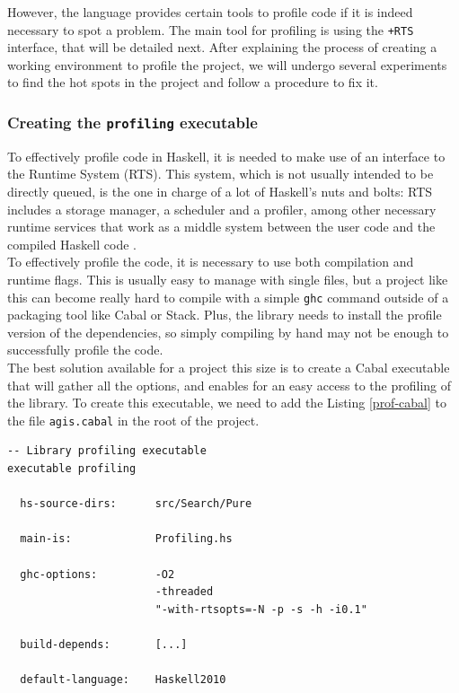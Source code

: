 However, the language provides certain tools to profile code if it is indeed
necessary to spot a problem. The main tool for profiling is using the
\texttt{+RTS} interface, that will be detailed next. After explaining the
process of creating a working environment to profile the project, we will
undergo several experiments to find the hot spots in the project and follow a
procedure to fix it.\\

\subsubsection{Creating the \texttt{profiling} executable}

To effectively profile code in Haskell, it is needed to make use of an
interface to the Runtime System (RTS). This system, which is not usually
intended to be directly queued, is the one in charge of a lot of Haskell's nuts
and bolts: RTS includes a storage manager, a scheduler and a profiler, among
other necessary runtime services that work as a middle system between the user
code and the compiled Haskell code \cite{ghc}.\\

To effectively profile the code, it is necessary to use both compilation and
runtime flags. This is usually easy to manage with single files, but a project
like this can become really hard to compile with a simple \texttt{ghc} command
outside of a packaging tool like Cabal or Stack. Plus, the library needs to
install the profile version of the dependencies, so simply compiling by hand
may not be enough to successfully profile the code.\\

The best solution available for a project this size is to create a Cabal
executable that will gather all the options, and enables for an easy access to
the profiling of the library. To create this executable, we need to add the
Listing \ref{prof-cabal} to the file \texttt{agis.cabal} in the root of the
project.\\

\begin{lstlisting}[style=haskell, label=prof-cabal, caption=
Setup for the \texttt{profiling} executable in the Cabal file]
-- Library profiling executable
executable profiling

  hs-source-dirs:      src/Search/Pure
           
  main-is:             Profiling.hs
  
  ghc-options:         -O2
                       -threaded
                       "-with-rtsopts=-N -p -s -h -i0.1"

  build-depends:       [...]

  default-language:    Haskell2010
\end{lstlisting}

